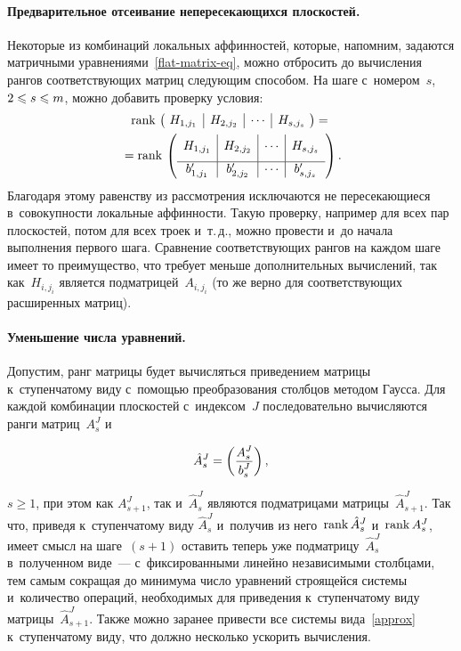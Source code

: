 \begin{multicols}{2}
\paragraph*{Предварительное отсеивание непересекающихся плоскостей.}
Некоторые из комбинаций локальных аффинностей, которые, напомним, задаются 
матричными уравнениями~\eqref{flat-matrix-eq}, можно отбросить до вычисления 
рангов соответствующих матриц следующим способом.
На шаге с~номером~$s$, $2\hm\leqslant s\hm\leqslant m$, можно добавить проверку условия:
\begin{multline*}
\rank \left(\!\begin{array}{c|c|c|c}
                H_{1,j_1} & H_{2,j_2} & \cdots & H_{s,j_s}\\
              \end{array}\!\right) ={}\\
              {}=
  \rank \left(\begin{array}{c|c|c|c}
                \rule{0pt}{1.2em} H_{1,j_1} & H_{2,j_2} & \cdots & 
H_{s,j_s}\\[6pt]
                \hline
                b'_{1,j_1} & b'_{2, j_2} & \cdots & b'_{s, j_s}
              \end{array}\right).
\end{multline*}
Благодаря этому равенству из рассмотрения исключаются не пересекающиеся 
в~совокупности локальные аффинности.
Такую проверку, например для всех пар плоскостей, потом для всех троек и~т.\,д., 
можно провести и~до начала выполнения первого шага.
Сравнение соответствующих рангов на каж\-дом шаге имеет то преимущество, что 
требует меньше дополнительных вычислений, так как~$H_{i,j_i}$ является 
подматрицей~$A_{i,j_i}$ (то же верно для соответствующих расширенных матриц).


\paragraph*{Уменьшение числа уравнений.}
Допустим, ранг мат\-ри\-цы будет вычисляться приведением мат\-ри\-цы к~ступенчатому виду с~помощью преобразования столбцов методом Гаусса.
Для каждой комбинации плоскостей с~индексом~$J$ последовательно вы\-чис\-ля\-ют\-ся 
ранги матриц~$A^{J}_s$ и

\noindent
$$
\hat A^{J}_s\hm=\left(\fr{A^{J}_s}{b^{J}_s}\right),
$$

\noindent
 $s\geqslant 1$, при этом как $A^{J}_{s+1}$, так 
          и~$\hat A^{J}_s$ являются под\-мат\-ри\-ца\-ми матрицы~$\hat A^{J}_{s+1}$.
Так что, приведя к~ступенчатому виду $\hat A^{J}_s$ и~получив из него~$\mathrm{rank}\, 
\hat A^{J}_s$ и~$\mathrm{rank}\, A^{J}_s$, имеет смысл на шаге~$(s+1)$ оставить теперь уже 
под\-мат\-ри\-цу~$\hat A^{J}_s$ в~полученном виде~--- с~фиксированными линейно 
независимыми столбцами, тем самым сокращая до минимума чис\-ло уравнений 
строящейся системы и~количество операций, необходимых для приведения 
к~ступенчатому виду матрицы~$\hat A^{J}_{s+1}$.
Также можно заранее привести все системы вида~\eqref{approx} к~ступенчатому 
виду, что должно несколько ускорить вычисления.



\end{multicols}
